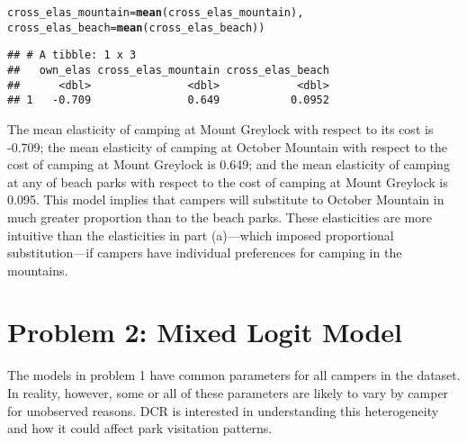 \documentclass[11pt,letterpaper]{article}\usepackage[]{graphicx}\usepackage[]{xcolor}
\makeatletter
\newcommand{\hlstd}[1]{\textcolor[rgb]{0.345,0.345,0.345}{#1}}%
\newcommand{\hlkwc}[1]{\textcolor[rgb]{0.333,0.667,0.333}{#1}}%
\newcommand{\hlkwd}[1]{\textcolor[rgb]{0.737,0.353,0.396}{\textbf{#1}}}%
\newenvironment{kframe}{%
 \def\at@end@of@kframe{}%
 \ifinner\ifhmode%
  \def\at@end@of@kframe{\end{minipage}}%
  \begin{minipage}{\columnwidth}%
 \fi\fi%
 \def\FrameCommand##1{\hskip\@totalleftmargin \hskip-\fboxsep
 \colorbox{shadecolor}{##1}\hskip-\fboxsep
     \hskip-\linewidth \hskip-\@totalleftmargin \hskip\columnwidth}%
 \MakeFramed {\advance\hsize-\width
   \@totalleftmargin\z@ \linewidth\hsize
   \@setminipage}}%
 {\par\unskip\endMakeFramed%
 \at@end@of@kframe}
\newenvironment{knitrout}{}{} %
\makeatother
\begin{document}
\begin{enumerate}[label=\alph*., leftmargin=*]
\begin{enumerate}[label=\roman*.]
\begin{knitrout}
\begin{kframe}
\begin{alltt}
            \hlkwc{cross_elas_mountain} \hlstd{=} \hlkwd{mean}\hlstd{(cross_elas_mountain),}
            \hlkwc{cross_elas_beach} \hlstd{=} \hlkwd{mean}\hlstd{(cross_elas_beach))}
\end{alltt}
\begin{verbatim}
## # A tibble: 1 x 3
##   own_elas cross_elas_mountain cross_elas_beach
##      <dbl>               <dbl>            <dbl>
## 1   -0.709               0.649           0.0952
\end{verbatim}
\end{kframe}
\end{knitrout}

		The mean elasticity of camping at Mount Greylock with respect to its cost is -0.709; the mean elasticity of camping at October Mountain with respect to the cost of camping at Mount Greylock is 0.649; and the mean elasticity of camping at any of beach parks with respect to the cost of camping at Mount Greylock is 0.095. This model implies that campers will substitute to October Mountain in much greater proportion than to the beach parks. These elasticities are more intuitive than the elasticities in part (a)---which imposed proportional substitution---if campers have individual preferences for camping in the mountains.
	\end{enumerate}
\end{enumerate}

\section*{Problem 2: Mixed Logit Model}

The models in problem 1 have common parameters for all campers in the dataset. In reality, however, some or all of these parameters are likely to vary by camper for unobserved reasons. DCR is interested in understanding this heterogeneity and how it could affect park visitation patterns.
\end{document}
